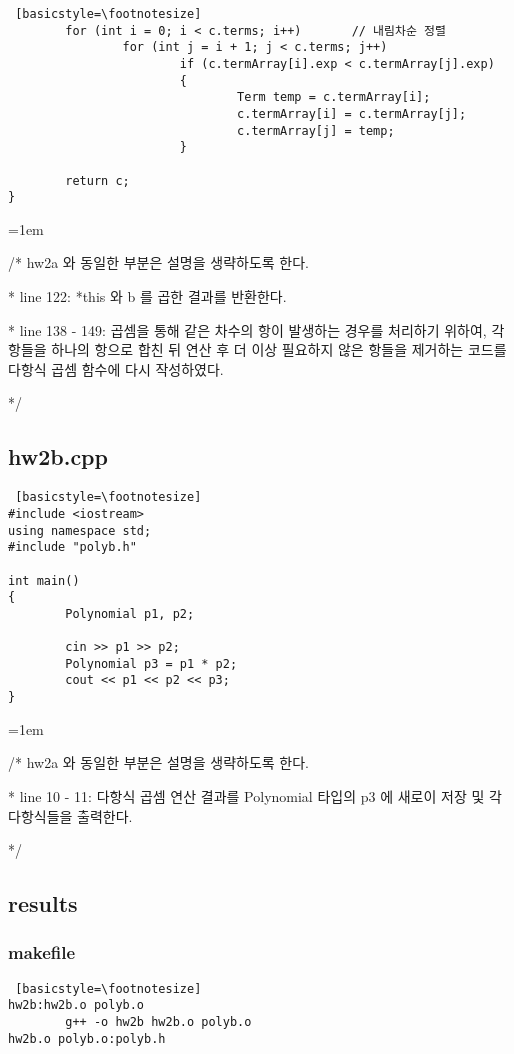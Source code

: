 \documentclass[twoside,twocolumn]{article}
\newenvironment{itemizeReduced}{
\begin{list}{\labelitemi}{\leftmargin=1em}
\setlength{\itemsep}{1pt}
\setlength{\parskip}{0pt}
\setlength{\parsep}{0pt}}{\end{list}
}
\begin{document}
\begin{lstlisting} [basicstyle=\footnotesize]
        for (int i = 0; i < c.terms; i++)       // 내림차순 정렬
                for (int j = i + 1; j < c.terms; j++)
                        if (c.termArray[i].exp < c.termArray[j].exp)
                        {
                                Term temp = c.termArray[i];
                                c.termArray[i] = c.termArray[j];
                                c.termArray[j] = temp;
                        }

        return c;
}
\end{lstlisting}
\begin{itemizeReduced}
    \item[/*] hw2a 와 동일한 부분은 설명을 생략하도록 한다.
    \item[*] line 122: *this 와 b 를 곱한 결과를 반환한다.
    \item[*] line 138 - 149: 곱셈을 통해 같은 차수의 항이 발생하는 경우를 처리하기 위하여, 각 항들을 하나의 항으로 합친 뒤 연산 후 더 이상 필요하지 않은 항들을 제거하는 코드를 다항식 곱셈 함수에 다시 작성하였다.
\end{itemizeReduced}
*/

\subsection{hw2b.cpp}
\begin{lstlisting} [basicstyle=\footnotesize]
#include <iostream>
using namespace std;
#include "polyb.h"

int main()
{
        Polynomial p1, p2;

        cin >> p1 >> p2;
        Polynomial p3 = p1 * p2;
        cout << p1 << p2 << p3;
}
\end{lstlisting}
\begin{itemizeReduced}
    \item[/*] hw2a 와 동일한 부분은 설명을 생략하도록 한다.
    \item[*] line 10 - 11: 다항식 곱셈 연산 결과를 Polynomial 타입의 p3 에 새로이 저장 및 각 다항식들을 출력한다.
\end{itemizeReduced}
*/

\subsection{results}
\subsubsection{makefile}
\begin{lstlisting} [basicstyle=\footnotesize]
hw2b:hw2b.o polyb.o
        g++ -o hw2b hw2b.o polyb.o
hw2b.o polyb.o:polyb.h
\end{lstlisting}
\end{document}
